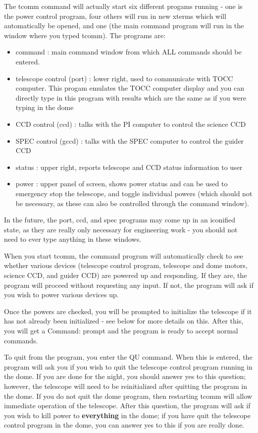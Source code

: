 \documentclass[10pt]{report}
\renewcommand{\[}{\begin{eqnarray}}
\renewcommand{\]}{\end{eqnarray}}
\begin{document}
The tcomm command will
actually start six different progams running - one is the power control
program, four others will run
in new xterms which will automatically be opened, and one (the main command
program will run in the window where you typed tcomm). The programs are:

\begin{itemize}
\item command : main command window from which ALL commands should
              be entered.
\item telescope control (port) : lower right, used to communicate with TOCC
              computer. This progam emulates the TOCC computer display and
              you can directly type in this program with results which are
              the same as if you were typing in the dome
\item CCD control (ccd) : talks with the PI computer to control the science CCD
\item SPEC control (gccd) : talks with the SPEC computer to control the guider CCD
\item status : upper right, reports telescope and CCD status information to user
\item power : upper panel of screen, shows power status and can be used to
emergency stop the telescope, and toggle individual powers (which should not
be necessary, as these can also be controlled through the command window).
\end{itemize}

In the future, the port, ccd, and spec programs may come up in an iconified
state, as they are really only necessary for engineering work - you should
not need to ever type anything in these windows.

When you start tcomm, the command program will automatically check to 
see whether various devices (telescope control program, telescope and dome
motors, science CCD, and guider CCD) are powered up and responding. If
they are, the program will proceed without requesting any input. If not,
the program will ask if you wish to power various devices up. 

Once the powers are checked, you will be prompted to initialize the telescope
if it has not already been initialized - see below for more details on
this. After this, you will get a Command: prompt and the program is
ready to accept normal commands.

To quit from the program, you enter the QU command. When this is entered,
the program will ask you if you wish to quit the telescope control program
running in the dome. If you are done for the night, you should answer
yes to this question; however, the telescope will need to be reinitialized
after quitting the program in the dome. If you do not quit the dome program,
then restarting tcomm will allow immediate operation of the telescope.
After this question, the program will ask if you wish to kill power to
\textbf{everything} in the dome; if you have quit the telescope control
program in the dome, you can answer yes to this if you are really done.
\end{document}
